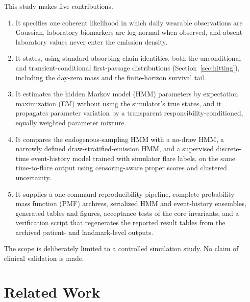 \documentclass{ieeeaccess}
\begin{document}
This study makes five contributions.
\begin{enumerate}
\item It specifies one coherent likelihood in which daily wearable observations are Gaussian, laboratory biomarkers are log-normal when observed, and absent laboratory values never enter the emission density.
\item It states, using standard absorbing-chain identities, both the unconditional and transient-conditional first-passage distributions (Section~\ref{sec:hitting}), including the day-zero mass and the finite-horizon survival tail.
\item It estimates the hidden Markov model (HMM) parameters by expectation maximization (EM) without using the simulator's true states, and it propagates parameter variation by a transparent responsibility-conditioned, equally weighted parameter mixture.
\item It compares the endogenous-sampling HMM with a no-draw HMM, a narrowly defined draw-stratified-emission HMM, and a supervised discrete-time event-history model trained with simulator flare labels, on the same time-to-flare output using censoring-aware proper scores and clustered uncertainty.
\item It supplies a one-command reproducibility pipeline, complete probability mass function (PMF) archives, serialized HMM and event-history ensembles, generated tables and figures, acceptance tests of the core invariants, and a verification script that regenerates the reported result tables from the archived patient- and landmark-level outputs.
\end{enumerate}

The scope is deliberately limited to a controlled simulation study. No claim of clinical validation is made.

\section{Related Work}
\end{document}
